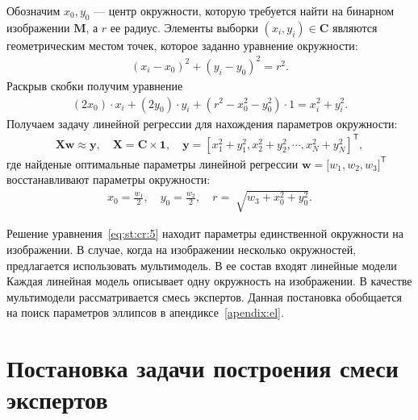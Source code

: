 \documentclass[12pt, twoside]{article}
\numberwithin{equation}{section}
\begin{document}
Обозначим $x_0, y_0$ --- центр окружности, которую требуется найти на бинарном изображении $\textbf{M}$, а $r$ ее радиус. Элементы выборки $\left(x_i, y_i\right)\in\textbf{C}$ являются геометрическим местом точек, которое заданно уравнение окружности:
\begin{equation}
\label{eq:st:cr:3}
\begin{aligned}
\left(x_i - x_0\right)^{2}+\left(y_i-y_0\right)^2 = r^2.
\end{aligned}
\end{equation}
Раскрыв скобки получим уравнение
\begin{equation}
\label{eq:st:cr:4}
\begin{aligned}
(2x_0)\cdot x_i + (2y_0)\cdot y_i+(r^2-x_0^2-y_0^2)\cdot1 = x_{i}^2 + y_{i}^2.
\end{aligned}
\end{equation}
Получаем задачу линейной регрессии для нахождения параметров окружности:
\begin{equation}
\label{eq:st:cr:5}
\begin{aligned}
\textbf{X}\textbf{w} \approx \textbf{y},  \quad \textbf{X} = \textbf{C}\times \textbf{1}, \quad \textbf{y} = [x_1^2+y_1^2, x_2^2+y_2^2, \cdots, x_N^2+y_N^2]^{\mathsf{T}},
\end{aligned}
\end{equation}
где найденые оптимальные параметры линейной регрессии $\textbf{w} = \bigr[w_1, w_2, w_3\bigr]^{\mathsf{T}}$ восстанавливают параметры окружности:
\begin{equation}
\label{eq:st:cr:6}
\begin{aligned}
x_0 = \frac{w_1}{2}, \quad y_0 = \frac{w_2}{2}, \quad r = \sqrt[]{w_3+x_{0}^{2}+y_{0}^{2}}.
\end{aligned}
\end{equation}

Решение уравнения~\eqref{eq:st:cr:5} находит параметры единственной окружности на изображении. В случае, когда на изображении несколько окружностей, предлагается использовать мультимодель. В ее состав входят линейные модели Каждая линейная модель описывает одну окружность на изображении. В качестве мультимодели рассматривается смесь экспертов. Данная постановка обобщается на поиск параметров эллипсов в апендиксе~\ref{apendix:el}.

\section{Постановка задачи построения смеси экспертов}
\end{document}
